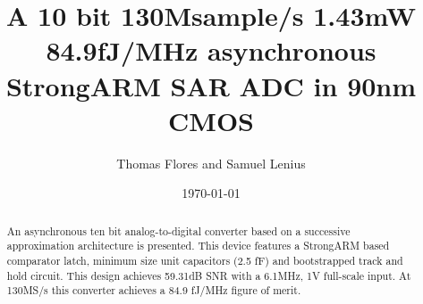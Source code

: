 \documentclass[10pt,journal]{IEEEtran}\usepackage{longtable}
\begin{document}




\title{A 10 bit 130Msample/s 1.43mW 84.9fJ/MHz asynchronous StrongARM SAR ADC in 90nm CMOS}
\author{Thomas Flores and Samuel Lenius}
\date{\today}
\maketitle

\begin{abstract}
An asynchronous ten bit analog-to-digital converter based on a successive approximation architecture is presented. This device features a StrongARM based comparator latch, minimum size unit capacitors (2.5 fF) and bootstrapped track and hold circuit. This design achieves 59.31dB SNR with a 6.1MHz, 1V full-scale input. At 130MS/s this converter achieves a 84.9 fJ/MHz figure of merit.
\end{abstract}


\end{document}
